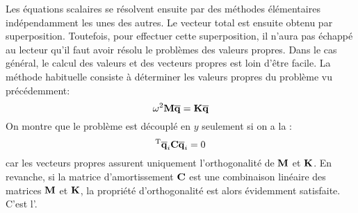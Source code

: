 Les équations scalaires se résolvent ensuite par des méthodes élémentaires indépendamment
les unes des autres. Le vecteur total est ensuite obtenu par superposition.
\medskipvm
Toutefois, pour effectuer cette superposition, il n'aura pas échappé au lecteur qu'il faut
avoir résolu le problèmes des valeurs propres.
Dans le cas général, le calcul des valeurs et des vecteurs propres  est loin
d'être facile.
La méthode habituelle consiste à déterminer les valeurs propres  du
problème vu précédemment:
\begin{equation} \omega^2\MM{M}\VV{\overline{q}}=\MM{K}\VV{\overline{q}} \end{equation}
On montre que le problème est découplé en $y$ seulement si on a la : \begin{equation}\LL{\overline{q}}_i\MM{C}\VV{\overline{q}}_i=0\end{equation}
\medskipvm
{} car les vecteurs propres assurent uniquement
l'orthogonalité de $\MM{M}$ et $\MM{K}$.
\medskipvm
En revanche, si la matrice d'amortissement $\MM{C}$ est une combinaison linéaire des matrices $\MM{M}$ et
$\MM{K}$, la propriété d'orthogonalité est alors évidemment satisfaite.
C'est l'.


